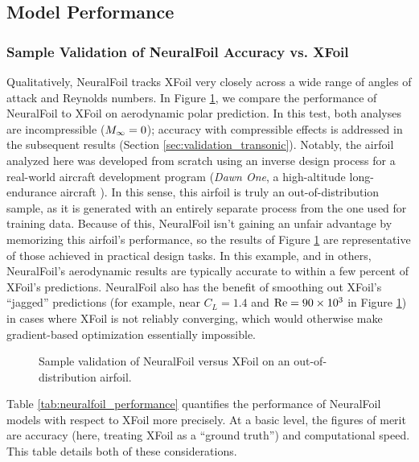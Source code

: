 \documentclass[conf]{new-aiaa}
\begin{document}

    \subsection{Model Performance}

    \subsubsection{Sample Validation of NeuralFoil Accuracy vs. XFoil}
    \label{sec:validation_basic}

    Qualitatively, NeuralFoil tracks XFoil very closely across a wide range of angles of attack and Reynolds numbers. In Figure \ref{fig:clcd_polar}, we compare the performance of NeuralFoil to XFoil on aerodynamic polar prediction. In this test, both analyses are incompressible ($M_\infty=0$); accuracy with compressible effects is addressed in the subsequent results (Section \ref{sec:validation_transonic}). Notably, the airfoil analyzed here was developed from scratch using an inverse design process for a real-world aircraft development program (\emph{Dawn One}, a high-altitude long-endurance aircraft \cite{sharpe_optimization_2021, sharpe_tailerons_2023}). In this sense, this airfoil is truly an out-of-distribution sample, as it is generated with an entirely separate process from the one used for training data. Because of this, NeuralFoil isn't gaining an unfair advantage by memorizing this airfoil's performance, so the results of Figure \ref{fig:clcd_polar} are representative of those achieved in practical design tasks. In this example, and in others, NeuralFoil's aerodynamic results are typically accurate to within a few percent of XFoil's predictions. NeuralFoil also has the benefit of smoothing out XFoil's ``jagged'' predictions (for example, near $C_L=1.4$ and $\rm Re=90 \times 10^3$ in Figure \ref{fig:clcd_polar}) in cases where XFoil is not reliably converging, which would otherwise make gradient-based optimization essentially impossible.

    \begin{figure}[h]
        \centering
        
        \caption{Sample validation of NeuralFoil versus XFoil on an out-of-distribution airfoil.}
        \label{fig:clcd_polar}
    \end{figure}

    Table \ref{tab:neuralfoil_performance} quantifies the performance of NeuralFoil models with respect to XFoil more precisely. At a basic level, the figures of merit are accuracy (here, treating XFoil as a ``ground truth'') and computational speed. This table details both of these considerations.
\end{document}
